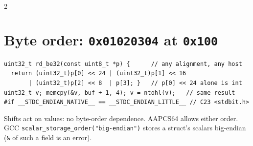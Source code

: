 \documentclass[8pt]{extarticle}
\newcommand\ct[1]{\texttt{#1}}
\begin{document}
\begin{multicols}{2}
\section{Byte order: \texttt{0x01020304} at \texttt{0x100}}
\begin{lstlisting}[style=CSheet]
uint32_t rd_be32(const uint8_t *p) {      // any alignment, any host
  return (uint32_t)p[0] << 24 | (uint32_t)p[1] << 16
       | (uint32_t)p[2] << 8  | p[3]; }   // p[0] << 24 alone is int
uint32_t v; memcpy(&v, buf + 1, 4); v = ntohl(v);   // same result
#if __STDC_ENDIAN_NATIVE__ == __STDC_ENDIAN_LITTLE__ // C23 <stdbit.h>
\end{lstlisting}
Shifts act on values: no byte-order dependence. AAPCS64 allows either order. GCC
\ct{scalar\_storage\_order("big-endian")} stores a struct's scalars big-endian (\ct{\&} of
such a field is an error).


\end{multicols}
\end{document}
